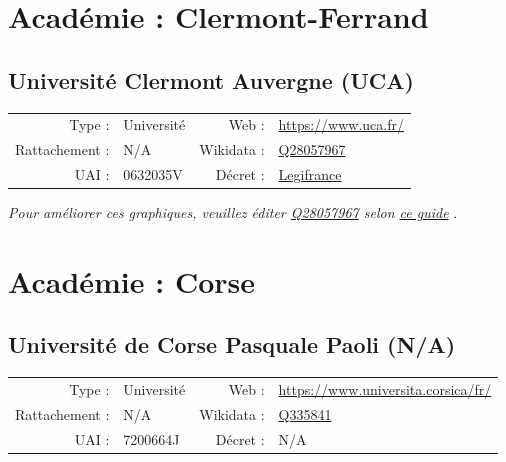 \documentclass[12pt,french,landscape]{article}
\begin{document}
\newpage

\hypertarget{acaduxe9mie-clermont-ferrand}{%
\section{Académie :
Clermont-Ferrand}\label{acaduxe9mie-clermont-ferrand}}

\hypertarget{universituxe9-clermont-auvergne-uca}{%
\subsection{Université Clermont Auvergne
(UCA)}\label{universituxe9-clermont-auvergne-uca}}

\begin{tabular*}{0.45\textwidth}{rp{2cm}rl}  
\hline  
Type : & Université & Web : &\href{https://www.uca.fr/}{https://www.uca.fr/} \\  
Rattachement : & N/A & Wikidata : & \href{https://www.wikidata.org/entity/Q28057967}{Q28057967} \\  
UAI : & 0632035V & Décret : & \href{https://www.legifrance.gouv.fr/affichTexte.do?cidTexte=JORFTEXT000033119145&categorieLien=id}{Legifrance} \\  
\hline  
\end{tabular*}

\textit{\scriptsize Pour améliorer ces graphiques, veuillez éditer \href{https://www.wikidata.org/entity/Q28057967}{Q28057967}  selon \href{https://github.com/cpesr/wikidataESR/blob/master/Rmd/wikidataESR.md}{ce guide}}
.


\newpage

\hypertarget{acaduxe9mie-corse}{%
\section{Académie : Corse}\label{acaduxe9mie-corse}}

\hypertarget{universituxe9-de-corse-pasquale-paoli-na}{%
\subsection{Université de Corse Pasquale Paoli
(N/A)}\label{universituxe9-de-corse-pasquale-paoli-na}}

\begin{tabular*}{0.45\textwidth}{rp{2cm}rl}  
\hline  
Type : & Université & Web : &\href{https://www.universita.corsica/fr/}{https://www.universita.corsica/fr/} \\  
Rattachement : & N/A & Wikidata : & \href{https://www.wikidata.org/entity/Q335841}{Q335841} \\  
UAI : & 7200664J & Décret : & N/A \\  
\hline  
\end{tabular*}
\end{document}
